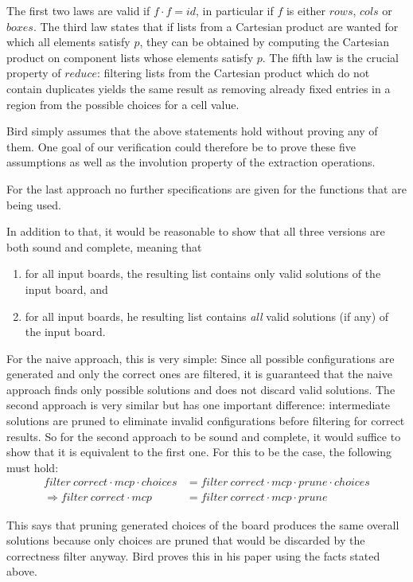 \documentclass[a4paper,11pt]{article}
\begin{document}
The first two laws are valid if \(f \cdot f = id\), in particular if \(f\) is either \(rows\), \(cols\) or \(boxes\).
The third law states that if lists from a Cartesian product are wanted for which all elements satisfy \(p\), they can be obtained by computing the Cartesian product on component lists whose elements satisfy \(p\).
The fifth law is the crucial property of \(reduce\): filtering lists from the Cartesian product which do not contain duplicates yields the same result as removing already fixed entries in a region from the possible choices for a cell value. 

Bird simply assumes that the above statements hold without proving any of them. One goal of our verification could therefore be to prove these five assumptions as well as the involution property of the extraction operations.

For the last approach no further specifications are given for the functions that are being used. 

In addition to that, it would be reasonable to show that all three versions are both sound and complete, meaning that
\begin{enumerate}
  \item for all input boards, the resulting list contains only valid solutions of the input board, and
  \item for all input boards, he resulting list contains \emph{all} valid solutions (if any) of the input board.
\end{enumerate}

For the naive approach, this is very simple: Since all possible configurations are generated and only the correct ones are filtered, it is guaranteed that the naive approach finds only possible solutions and does not discard valid solutions. The second approach is very similar but has one important difference: intermediate solutions are pruned to eliminate invalid configurations before filtering for correct results. So for the second approach to be sound and complete, it would suffice to show that it is equivalent to the first one. For this to be the case, the following must hold:
\begin{align*}
  filter~correct \cdot mcp \cdot choices &= filter~correct \cdot mcp \cdot prune \cdot choices\\
  \Rightarrow filter~correct \cdot mcp &= filter~correct \cdot mcp \cdot prune
\end{align*}

This says that pruning generated choices of the board produces the same overall solutions because only choices are pruned that would be discarded by the correctness filter anyway. Bird proves this in his paper using the facts stated above.
\end{document}
